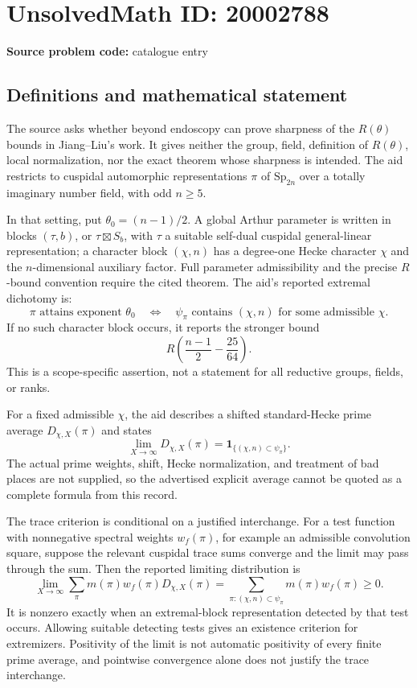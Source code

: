 \documentclass[11pt]{article}
\begin{document}
\section*{UnsolvedMath ID: 20002788}
\textbf{Source problem code:} catalogue entry
\subsection{Definitions and mathematical statement}
The source asks whether beyond endoscopy can prove sharpness of the $R(\theta)$ bounds in Jiang--Liu's work. It gives neither the group, field, definition of $R(\theta)$, local normalization, nor the exact theorem whose sharpness is intended. The aid restricts to cuspidal automorphic representations $\pi$ of $\mathrm{Sp}_{2n}$ over a totally imaginary number field, with odd $n\ge5$.

In that setting, put $\theta_0=(n-1)/2$. A global Arthur parameter is written in blocks $(\tau,b)$, or $\tau\boxtimes S_b$, with $\tau$ a suitable self-dual cuspidal general-linear representation; a character block $(\chi,n)$ has a degree-one Hecke character $\chi$ and the $n$-dimensional auxiliary factor. Full parameter admissibility and the precise $R$-bound convention require the cited theorem. The aid's reported extremal dichotomy is:
\[
 \pi\text{ attains exponent }\theta_0
 \quad\Longleftrightarrow\quad
 \psi_\pi\text{ contains }(\chi,n)\text{ for some admissible }\chi.
\]
If no such character block occurs, it reports the stronger bound
\[
 R\!\left(\frac{n-1}{2}-\frac{25}{64}\right).
\]
This is a scope-specific assertion, not a statement for all reductive groups, fields, or ranks.

For a fixed admissible $\chi$, the aid describes a shifted standard-Hecke prime average $D_{\chi,X}(\pi)$ and states
\[
 \lim_{X\to\infty}D_{\chi,X}(\pi)
 =\mathbf1_{\{(\chi,n)\subset\psi_\pi\}}.
\]
The actual prime weights, shift, Hecke normalization, and treatment of bad places are not supplied, so the advertised explicit average cannot be quoted as a complete formula from this record.

The trace criterion is conditional on a justified interchange. For a test function with nonnegative spectral weights $w_f(\pi)$, for example an admissible convolution square, suppose the relevant cuspidal trace sums converge and the limit may pass through the sum. Then the reported limiting distribution is
\[
 \lim_{X\to\infty}\sum_\pi m(\pi)w_f(\pi)D_{\chi,X}(\pi)
 =\sum_{\pi:(\chi,n)\subset\psi_\pi}m(\pi)w_f(\pi)\ge0.
\]
It is nonzero exactly when an extremal-block representation detected by that test occurs. Allowing suitable detecting tests gives an existence criterion for extremizers. Positivity of the limit is not automatic positivity of every finite prime average, and pointwise convergence alone does not justify the trace interchange.
\end{document}
